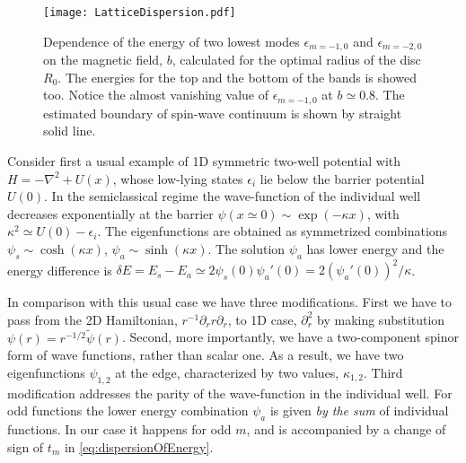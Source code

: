 \documentclass[aps,prb,twocolumn,superscriptaddress,nobalancelastpage]{revtex4-1}
\begin{document}

\begin{figure}[t]
\texttt{[image: LatticeDispersion.pdf]}
\caption{\label{pic:2lowest} 
Dependence of the energy of two lowest modes $\epsilon _{m=-1,0}$ and $\epsilon_{m=-2,0}$ on the magnetic field,  $b$, calculated  for the optimal radius of the disc $R_{0}$. The energies for the top and the bottom of the bands is showed too. Notice the almost vanishing value of $\epsilon_{m=-1,0}$ at  $b\simeq 0.8$. The estimated boundary of spin-wave continuum is shown by straight solid line.}
\label{fig:LatticeDispersion}
\end{figure}

Consider first a usual example of 1D symmetric two-well potential with $H = -\nabla^{2} + U(x)$, whose low-lying states $\epsilon _{i}$ lie below the barrier potential $U(0)$. In the semiclassical regime the wave-function of the individual well decreases exponentially at the barrier $\psi(x\simeq 0) \sim \exp (-\kappa x) $, with $\kappa^{2} \simeq U(0)-\epsilon _{i}$. The eigenfunctions are obtained as symmetrized combinations $\psi_{s} \sim \cosh(\kappa x)$, $\psi_{a} \sim \sinh(\kappa x)$. The   solution $\psi_{a} $ has lower energy and the energy difference is   $\delta E = E_{s}-E_{a} \simeq 2 \psi_{s}(0) \psi_{a}'(0) =2 (\psi_{a}'(0))^{2}/\kappa$.  \cite{Landau1981Quantum}  

In comparison with this usual case we have three modifications. First we have to pass from the 2D Hamiltonian, $r^{-1}\partial _{r} r \partial _{r}$,  to 1D case, $\partial_{r}^{2}$ by making substitution $\psi(r) = r^{-1/2}\tilde \psi (r)$. Second, more importantly, we have a two-component spinor form of wave functions, rather than scalar one. As a result, we have two eigenfunctions $\psi_{1,2}$ at the edge, characterized by two values, $\kappa_{1,2}$.  Third modification addresses the parity of the wave-function in the individual well. For odd functions the lower energy combination $\psi_{a}$ is given \emph{by the sum} of individual functions. In our case it happens for odd $m$, and is accompanied by a change of sign of $t_{m}$ in \eqref{eq:dispersionOfEnergy}.   
\end{document}
